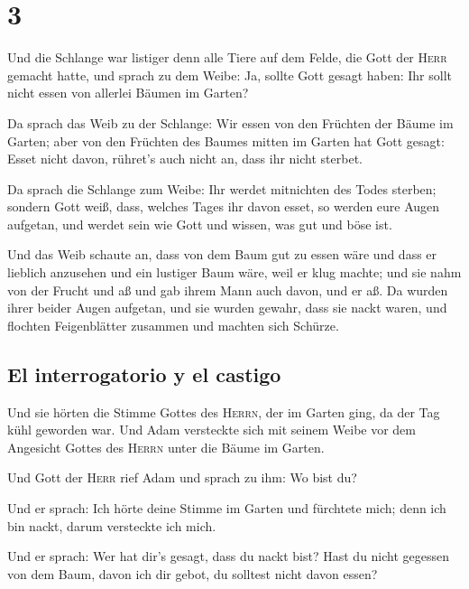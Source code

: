 \hypertarget{section-2}{%
\section{3}\label{section-2}}

 Und die Schlange war listiger denn alle Tiere auf dem
Felde, die Gott der \textsc{Herr} gemacht hatte, und sprach zu dem
Weibe: Ja, sollte Gott gesagt haben: Ihr sollt nicht essen von allerlei
Bäumen im Garten?

 Da sprach das Weib zu der Schlange: Wir essen von den
Früchten der Bäume im Garten;  aber von den Früchten des
Baumes mitten im Garten hat Gott gesagt: Esset nicht davon, rühret's
auch nicht an, dass ihr nicht sterbet.

 Da sprach die Schlange zum Weibe: Ihr werdet mitnichten
des Todes sterben;  sondern Gott weiß, dass, welches Tages
ihr davon esset, so werden eure Augen aufgetan, und werdet sein wie Gott
und wissen, was gut und böse ist.

 Und das Weib schaute an, dass von dem Baum gut zu essen
wäre und dass er lieblich anzusehen und ein lustiger Baum wäre, weil er
klug machte; und sie nahm von der Frucht und aß und gab ihrem Mann auch
davon, und er aß.  Da wurden ihrer beider Augen aufgetan,
und sie wurden gewahr, dass sie nackt waren, und flochten Feigenblätter
zusammen und machten sich Schürze.

\hypertarget{el-interrogatorio-y-el-castigo}{%
\subsection{El interrogatorio y el
castigo}\label{el-interrogatorio-y-el-castigo}}

 Und sie hörten die Stimme Gottes des \textsc{Herrn}, der
im Garten ging, da der Tag kühl geworden war. Und Adam versteckte sich
mit seinem Weibe vor dem Angesicht Gottes des \textsc{Herrn} unter die
Bäume im Garten.

 Und Gott der \textsc{Herr} rief Adam und sprach zu ihm:
Wo bist du?

 Und er sprach: Ich hörte deine Stimme im Garten und
fürchtete mich; denn ich bin nackt, darum versteckte ich mich.

 Und er sprach: Wer hat dir's gesagt, dass du nackt bist?
Hast du nicht gegessen von dem Baum, davon ich dir gebot, du solltest
nicht davon essen?


